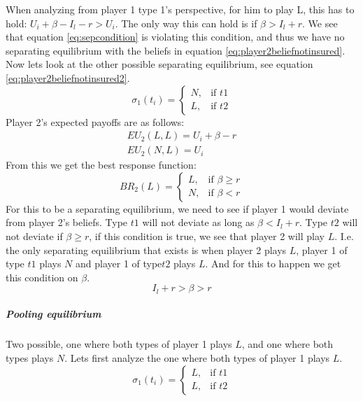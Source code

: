 When analyzing from player 1 type 1's perspective, for him to play L, this has to hold: $U_{i}+\beta-I_{l}-r > U_{i}$. The only way this can hold is if $\beta>I_{l}+r$. We see that equation \ref{eq:sepcondition} is violating this condition, and thus we have no separating equilibrium with the beliefs in equation \ref{eq:player2beliefnotinsured}.
Now lets look at the other possible separating equilibrium, see equation \ref{eq:player2beliefnotinsured2}.
\begin{equation}
    \sigma_{1}(t_{i})= 
\begin{cases}
   N,& \text{if } t1\\
   L,& \text{if } t2  
\end{cases}
\label{eq:player2beliefnotinsured2}
\end{equation}
Player 2's expected payoffs are as follows:
\begin{eqnarray}
EU_{2}(L,L)=U_{i}+\beta-r \\
EU_{2}(N,L)=U_{i}
\end{eqnarray}
From this we get the best response function:
\begin{equation}
BR_{2}(L)=
\begin{cases}
L ,& \text{if } \beta\geq r \\
N ,& \text{if } \beta<r 
\end{cases}
\end{equation}
For this to be a separating equilibrium, we need to see if player 1 would deviate from player 2's beliefs. 
Type $t1$ will not deviate as long as $\beta<I_{l}+r$. Type $t2$ will not deviate if $\beta \geq r$, if this condition is true, we see that player 2 will play $L$. I.e. the only separating equilibrium that exists is when player 2 plays $L$, player 1 of type $t1$ plays $N$ and player 1 of type$t2$ plays $L$.
And for this to happen we get this condition on $\beta$. \begin{equation}
I_{l}+r>\beta>r
\label{eq:conditionseparatingequilibrium}
\end{equation}
\subparagraph{Pooling equilibrium}
Two possible, one where both types of player 1 plays $L$, and one where both types plays $N$. Lets first analyze the one where both types of player 1 plays $L$.
\begin{equation}
    \sigma_{1}(t_{i})= 
\begin{cases}
   L,& \text{if } t1\\
   L,& \text{if } t2  
\end{cases}
\label{eq:player2beliefnotinsuredpooling}
\end{equation}
